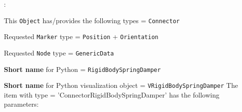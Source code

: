 \noindent {}:
\bi
  \item This \texttt{Object} has/provides the following types = \texttt{Connector}
  \item Requested \texttt{Marker} type = \texttt{Position} + \texttt{Orientation}
  \item Requested \texttt{Node} type = \texttt{GenericData}
  \item {\bf Short name} for Python = \texttt{RigidBodySpringDamper}
  \item {\bf Short name} for Python visualization object = \texttt{VRigidBodySpringDamper}
\ei\vspace{12pt} \noindent 
The item  with type = 'ConnectorRigidBodySpringDamper' has the following parameters:
\vspace{-0.5cm}\\
\vspace{-0.5cm}\\
